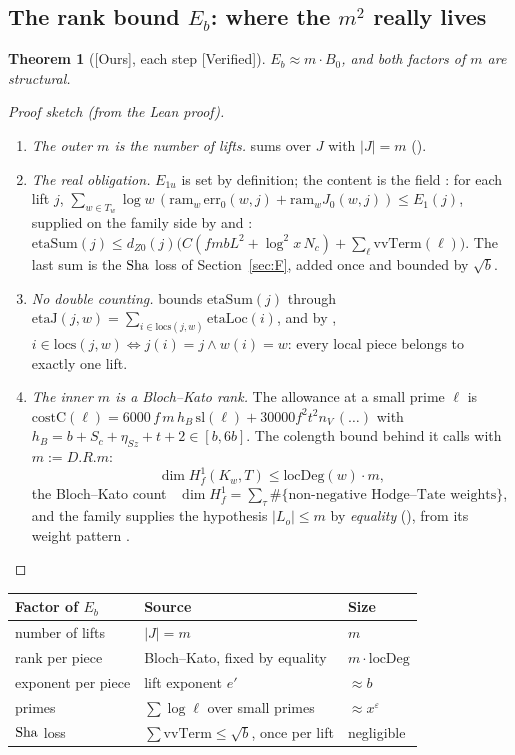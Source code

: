 \documentclass[11pt]{article}
\newcommand{\Verified}{\textcolor{verc}{\textsf{\small[Verified]}}}
\newcommand{\Ours}{\textcolor{oursc}{\textsf{\small[Ours]}}}
\newcommand{\eps}{\varepsilon}
\theoremstyle{plain}
\newtheorem{theorem}{Theorem}[section]
\theoremstyle{definition}
\newenvironment{sketch}{\begin{proof}[Proof sketch (from the Lean proof)]}{\end{proof}}
\begin{document}
\subsection{The rank bound $E_b$: where the $m^2$ really lives}

\begin{theorem}[\Ours, each step \Verified]\label{thm:Eb}
$E_b\approx m\cdot B_0$, and both factors of $m$ are structural.
\end{theorem}

\begin{sketch}
\begin{enumerate}
\item \emph{The outer $m$ is the number of lifts.}  sums over $J$ with
  $|J|=m$ ().
\item \emph{The real obligation.} $E_{1u}$ is set by definition; the content is the field
  : for each lift $j$,
  $\sum_{w\in T_w}\log w\,(\mathrm{ram}_w\,\mathrm{err}_0(w,j)+\mathrm{ram}_w J_0(w,j))\le E_1(j)$,
  supplied on the family side by  and :
  $\mathrm{etaSum}(j)\le d_{Z0}(j)\bigl(C(fmbL^2+\log^2x\,N_c)+\sum_\ell\mathrm{vvTerm}(\ell)\bigr)$.
  The last sum is the $\mathrm{Sha}$ loss of Section~\ref{sec:F}, added once and bounded by $\sqrt b$.
\item \emph{No double counting.}  bounds $\mathrm{etaSum}(j)$ through
  $\mathrm{etaJ}(j,w)=\sum_{i\in\mathrm{locs}(j,w)}\mathrm{etaLoc}(i)$, and by
  , $i\in\mathrm{locs}(j,w)\iff j(i)=j\wedge w(i)=w$: every local piece
  belongs to exactly one lift.
\item \emph{The inner $m$ is a Bloch--Kato rank.} The allowance at a small prime $\ell$ is
  $\mathrm{costC}(\ell)=6000\,f\,m\,h_B\,\mathrm{sl}(\ell)+30000f^2t^2n_V\,(\dots)$ with
  $h_B=b+S_c+\eta_{Sz}+t+2\in[b,6b]$. The colength bound behind it calls  with
  $m:=D.R.m$:
  \[
  \dim H^1_f(K_w,T)\le\mathrm{locDeg}(w)\cdot m,
  \]
  the Bloch--Kato count~\cite{bloch-kato} $\dim H^1_f=\sum_\tau\#\{\text{non-negative Hodge--Tate weights}\}$, and the
  family supplies the hypothesis $|L_o|\le m$ by \emph{equality} (), from its weight
  pattern .
\end{enumerate}
\end{sketch}

\begin{center}
\renewcommand{\arraystretch}{1.15}
\begin{tabular}{@{}lll@{}}
\toprule
Factor of $E_b$ & Source & Size\\
\midrule
number of lifts & $|J|=m$ & $m$\\
rank per piece & Bloch--Kato, fixed by equality & $m\cdot\mathrm{locDeg}$\\
exponent per piece & lift exponent $e'$ & $\approx b$\\
primes & $\sum\log\ell$ over small primes & $\approx x^\eps$\\
$\mathrm{Sha}$ loss & $\sum\mathrm{vvTerm}\le\sqrt b$, once per lift & negligible\\
\bottomrule
\end{tabular}
\end{center}
\end{document}
